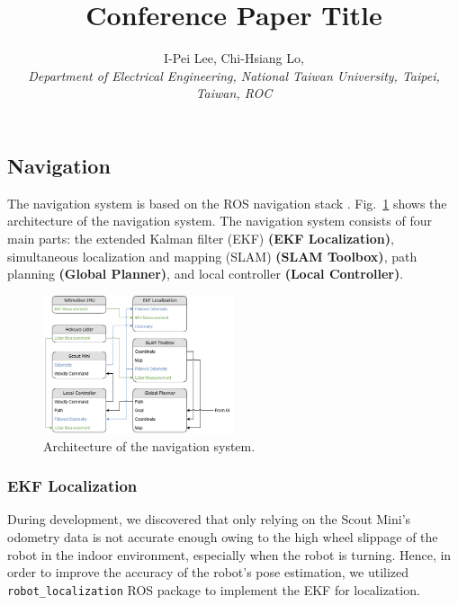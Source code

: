 \documentclass[conference]{IEEEtran}
\begin{document}
\title{Conference Paper Title}
\author{
    I-Pei Lee, Chi-Hsiang Lo, \\
    \textit{Department of Electrical Engineering, National Taiwan University, Taipei, Taiwan, ROC}
}

\maketitle

\subsection{Navigation}

The navigation system is based on the ROS navigation stack \cite{navigation_stack}. Fig.~\ref{fig_navigation} shows the architecture of the navigation system. The navigation system consists of four main parts: the extended Kalman filter (EKF) \textbf{(EKF Localization)}, simultaneous localization and mapping (SLAM) \textbf{(SLAM Toolbox)}, path planning \textbf{(Global Planner)}, and local controller \textbf{(Local Controller)}.

\begin{figure}[htbp]
    \centerline{\includegraphics[width=0.5\textwidth]{figures/architecture.png}}
    \caption{Architecture of the navigation system.}
    \label{fig_navigation}
\end{figure}

\subsubsection{EKF Localization}

During development, we discovered that only relying on the Scout Mini's odometry data is not accurate enough owing to the high wheel slippage of the robot in the indoor environment, especially when the robot is turning. Hence, in order to improve the accuracy of the robot's pose estimation, we utilized \verb|robot_localization| \cite{robot_localization} ROS package to implement the EKF for localization.
\end{document}
